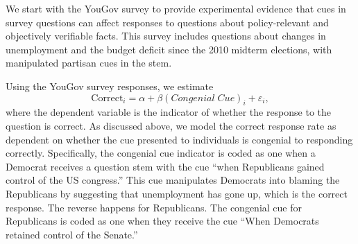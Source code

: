 \documentclass[12pt, letterpaper]{article}
\begin{document}
	We start with the YouGov survey to provide experimental evidence that cues in survey questions can affect responses to questions about policy-relevant and objectively verifiable facts. This survey includes questions about changes in unemployment and the budget deficit since the 2010 midterm elections, with manipulated partisan cues in the stem. 
	
	Using the YouGov survey responses, we estimate
	\begin{equation}\label{eq:pgap-yougov}
	\text{Correct}_{i} = \alpha + \beta (Congenial \; Cue)_i  +\varepsilon_{i},
	\end{equation}
	where the dependent variable is the indicator of whether the response to the question is correct.
	As discussed above, we model the correct response rate as dependent on whether the cue presented to individuals is congenial to responding correctly. Specifically, the congenial cue indicator is coded as one when a Democrat receives a question stem with the cue ``when Republicans gained control of the US congress.'' This cue manipulates Democrats into blaming the Republicans by suggesting that unemployment has gone up, which is the correct response. The reverse happens for Republicans. The congenial cue for Republicans is coded as one when they receive the cue ``When Democrats retained control of the Senate.''
	
\end{document}
